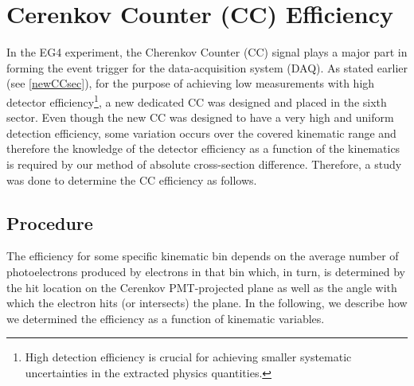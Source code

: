 \hspace{0.5cm}





\section{Cerenkov Counter (CC) Efficiency}

In the EG4 experiment, the Cherenkov Counter (CC) signal plays a major part in forming the event trigger for %
the data-acquisition system (DAQ). As stated earlier (see \ref{newCCsec}), for the purpose of achieving low \qsqs measurements with high detector efficiency\footnote{High detection efficiency is crucial for achieving smaller systematic uncertainties in the extracted physics quantities.}, a new %
dedicated CC was designed and placed in the sixth sector. Even though the new CC was designed to have a very high and uniform detection efficiency, some variation occurs over the covered kinematic range and therefore the knowledge of the detector efficiency as a function of the kinematics is required by our method of absolute cross-section difference. %
Therefore, a study was done to determine the CC efficiency as follows. 



\subsection{Procedure}

The efficiency for some specific kinematic bin depends on the average number of photoelectrons %
produced by electrons in that bin which, in turn, is determined by the hit location on the Cerenkov PMT-projected plane %
as well as the angle with which the %
electron hits (or intersects) the plane. In the following, we describe how we determined the efficiency as a function of kinematic variables. %



